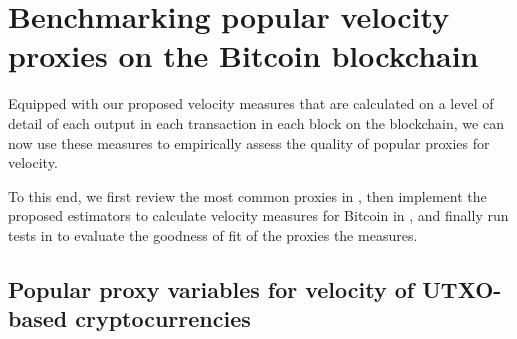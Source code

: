 
\section{Benchmarking popular velocity proxies on the Bitcoin blockchain }
\label{sec:results}%

Equipped with our proposed velocity measures that are calculated on a level
of detail of each output in each transaction in each block on the blockchain,
we can now use these measures to empirically assess the quality of popular
proxies for velocity.

To this end, we first review the most common proxies in
, then implement the proposed estimators to
calculate velocity measures for Bitcoin in , and
finally run tests in  to evaluate the goodness
of fit of the proxies \wrt the measures.

%
%
\vspace*{1em}%
\renewcommand{\captionGlo} {Descriptives for velocity proxies and measures
  with $\perd = \wndwLength = 1 \ttext{ day}$ for 2013-06-01 to 2019-06-01.}%
\renewcommand{\labelGlo}{\label{tbl:descriptives_est_and_app}}%
%

\subsection{Popular proxy variables for velocity of UTXO-based
  cryptocurrencies}
\label{sec:results:sub:approx_crypto}%


